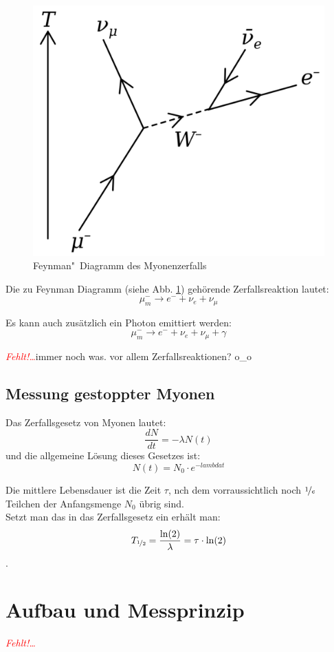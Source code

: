 \documentclass[12pt,a4paper,ngerman]{report}
\providecommand{\fehlt}{\textcolor{red}{\emph{Fehlt!\dots}}}
\begin{document}
		\begin{figure}[ht]
		\centering
		\includegraphics[width=.7\textwidth]{Bilder/Feynman_Myon}		
		\caption{Feynman"~Diagramm des Myonenzerfalls}
		\label{fig:Feynman_Myon}
	\end{figure}
	
	Die zu Feynman Diagramm (siehe Abb. \ref{fig:Feynman_Myon}) gehörende Zerfallsreaktion lautet:
	\[\mu^{-}_{m} \rightarrow e^{-} + \nu_e + \nu_{\mu} \]
	
	Es kann auch zusätzlich ein Photon emittiert werden:
	\[\mu^{-}_{m} \rightarrow e^{-} + \nu_e + \nu_{\mu} + \gamma \]
	
	
	\fehlt immer noch was. vor allem Zerfallsreaktionen? o\_o
	\section{Messung gestoppter Myonen}
		Das Zerfallsgesetz von Myonen lautet:
		\[\frac{dN}{dt}= -\lambda N(t)\]
		und die allgemeine Lösung dieses Gesetzes ist:
		\[N(t) = N_0 \cdot e^{-lambda t}\]
		
		Die mittlere Lebensdauer ist die Zeit $\tau$, nch dem vorraussichtlich noch $\nicefrac{1}{e}$ Teilchen der Anfangsmenge $N_0$ übrig sind. \\
		Setzt man das in das Zerfallsgesetz ein erhält man:
		\[T_{\nicefrac{1}{2}} = \frac{\ln(2)}{\lambda} = \tau \cdot \ln(2) \].
		

\chapter{Aufbau und Messprinzip}
	\fehlt
\end{document}
